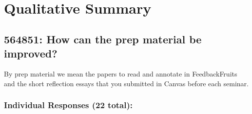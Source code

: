 \documentclass[a4paper]{report}
\begin{document}
\section{Qualitative Summary}

\subsection{564851: How can the prep material be improved?}

By prep material we mean the papers to read and annotate in FeedbackFruits and 
the short reflection essays that you submitted in Canvas before each seminar.

\subsubsection{Individual Responses (22 total):}
\end{document}
